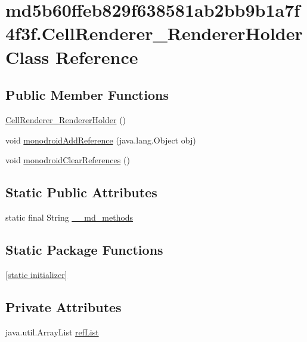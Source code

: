\hypertarget{classmd5b60ffeb829f638581ab2bb9b1a7f4f3f_1_1_cell_renderer___renderer_holder}{
\section{md5b60ffeb829f638581ab2bb9b1a7f4f3f.CellRenderer\_\-RendererHolder Class Reference}
\label{classmd5b60ffeb829f638581ab2bb9b1a7f4f3f_1_1_cell_renderer___renderer_holder}
}
\subsection*{Public Member Functions}
\begin{CompactItemize}
\item 
\hyperlink{classmd5b60ffeb829f638581ab2bb9b1a7f4f3f_1_1_cell_renderer___renderer_holder_406aaaa10f219cf878916a049b2823a0}{CellRenderer\_\-RendererHolder} ()
\item 
void \hyperlink{classmd5b60ffeb829f638581ab2bb9b1a7f4f3f_1_1_cell_renderer___renderer_holder_9dfe45e5cb1c36ddbfe31a4068cb0394}{monodroidAddReference} (java.lang.Object obj)
\item 
void \hyperlink{classmd5b60ffeb829f638581ab2bb9b1a7f4f3f_1_1_cell_renderer___renderer_holder_21da82531ee5902ab97748aa2bb500c6}{monodroidClearReferences} ()
\end{CompactItemize}
\subsection*{Static Public Attributes}
\begin{CompactItemize}
\item 
static final String \hyperlink{classmd5b60ffeb829f638581ab2bb9b1a7f4f3f_1_1_cell_renderer___renderer_holder_4578cafbc2b812d71e4d477b6ee135b3}{\_\-\_\-md\_\-methods}
\end{CompactItemize}
\subsection*{Static Package Functions}
\begin{CompactItemize}
\item 
\hyperlink{classmd5b60ffeb829f638581ab2bb9b1a7f4f3f_1_1_cell_renderer___renderer_holder_6e2f86c163f4ac5e844c4008ce2b34d9}{\mbox{[}static initializer\mbox{]}}
\end{CompactItemize}
\subsection*{Private Attributes}
\begin{CompactItemize}
\item 
java.util.ArrayList \hyperlink{classmd5b60ffeb829f638581ab2bb9b1a7f4f3f_1_1_cell_renderer___renderer_holder_5816b2be32fb4cd9e5417611fa927491}{refList}
\end{CompactItemize}


